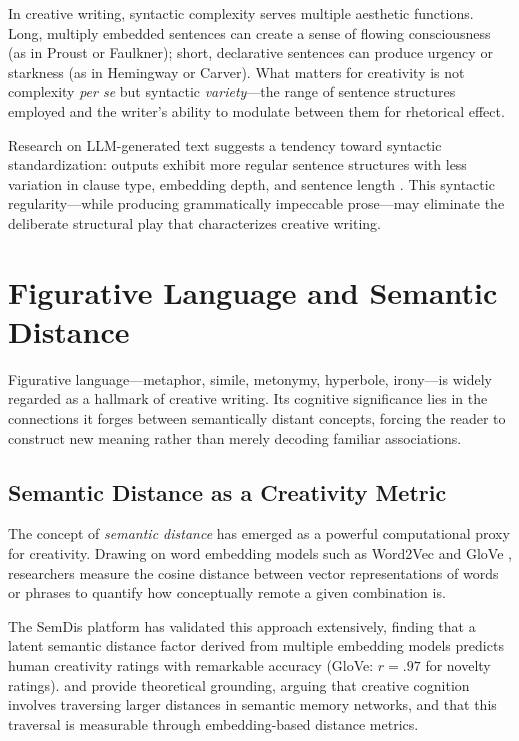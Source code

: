 \documentclass[12pt,a4paper]{article}
\begin{document}
In creative writing, syntactic complexity serves multiple aesthetic functions. Long, multiply embedded sentences can create a sense of flowing consciousness (as in Proust or Faulkner); short, declarative sentences can produce urgency or starkness (as in Hemingway or Carver). What matters for creativity is not complexity \emph{per se} but syntactic \emph{variety}---the range of sentence structures employed and the writer's ability to modulate between them for rhetorical effect.

Research on LLM-generated text suggests a tendency toward syntactic standardization: outputs exhibit more regular sentence structures with less variation in clause type, embedding depth, and sentence length \citep{tang2024survey, stylometric_llm2025}. This syntactic regularity---while producing grammatically impeccable prose---may eliminate the deliberate structural play that characterizes creative writing.

\section{Figurative Language and Semantic Distance}

Figurative language---metaphor, simile, metonymy, hyperbole, irony---is widely regarded as a hallmark of creative writing. Its cognitive significance lies in the connections it forges between semantically distant concepts, forcing the reader to construct new meaning rather than merely decoding familiar associations.

\subsection{Semantic Distance as a Creativity Metric}

The concept of \emph{semantic distance} has emerged as a powerful computational proxy for creativity. Drawing on word embedding models such as Word2Vec \citep{mikolov2013word2vec} and GloVe \citep{pennington2014glove}, researchers measure the cosine distance between vector representations of words or phrases to quantify how conceptually remote a given combination is.

The SemDis platform \citep{beaty2014automating} has validated this approach extensively, finding that a latent semantic distance factor derived from multiple embedding models predicts human creativity ratings with remarkable accuracy (GloVe: $r = .97$ for novelty ratings). \citet{kenett2019semantic} and \citet{green2019going} provide theoretical grounding, arguing that creative cognition involves traversing larger distances in semantic memory networks, and that this traversal is measurable through embedding-based distance metrics.
\end{document}
